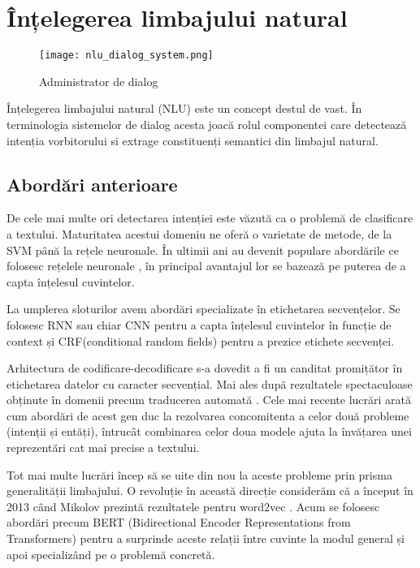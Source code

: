 \section{Înțelegerea limbajului natural}
\begin{figure}[h]
	\centering
	\texttt{[image: nlu\_dialog\_system.png]}
	\caption{Administrator de dialog}
	\label{fig:nlu_ds_proc}
\end{figure}

Înțelegerea limbajului natural (NLU) este un concept destul de vast. În terminologia sistemelor de dialog acesta joacă rolul componentei care detectează intenția vorbitorului si extrage constituenți semantici din limbajul natural.

\subsection{Abordări anterioare}

De cele mai multe ori detectarea intenției este văzută ca o problemă de clasificare a textului. Maturitatea acestui domeniu ne oferă o varietate de metode, de la SVM până la rețele neuronale. În ultimii ani au devenit populare abordările ce folosesc rețelele neuronale \cite{recursive-nn-intent, boosting-intent, boostingplus-intent, att_joint_bing},  în principal avantajul lor se bazează pe puterea de a capta înțelesul cuvintelor.

La umplerea sloturilor avem abordări specializate în etichetarea secvențelor. Se folosesc RNN \cite{mesnil-rnn-crf, rnn-em, deep-lstm} sau chiar CNN \cite{sarika-cnn-crf} pentru a capta înțelesul cuvintelor în funcție de context și CRF(conditional random fields) pentru a prezice etichete secvenței.

Arhitectura de codificare-decodificare s-a dovedit a fi un canditat promițător în etichetarea datelor cu caracter secvențial. Mai ales după rezultatele spectaculoase obținute în domenii precum traducerea automată \cite{bahdanau, trans_luong_manning}. Cele mai recente lucrări arată cum abordări de acest gen duc la rezolvarea concomitenta a celor două probleme (intenții și entăți), întrucât combinarea celor doua modele ajuta la învățarea unei reprezentări cat mai precise a textului. \cite{recursive-nn-intent, att_joint_bing, joint_online_bing, bi-model}

Tot mai multe lucrări încep să se uite din nou la aceste probleme prin prisma generalității limbajului. O revoluție în această direcție considerăm că a început în 2013 când Mikolov prezintă rezultatele pentru word2vec \cite{mikolov2013}. Acum se folosesc abordări precum BERT (Bidirectional Encoder Representations from Transformers) \cite{joint-bert} pentru a surprinde aceste relații între cuvinte la modul general și apoi specializând pe o problemă concretă.

